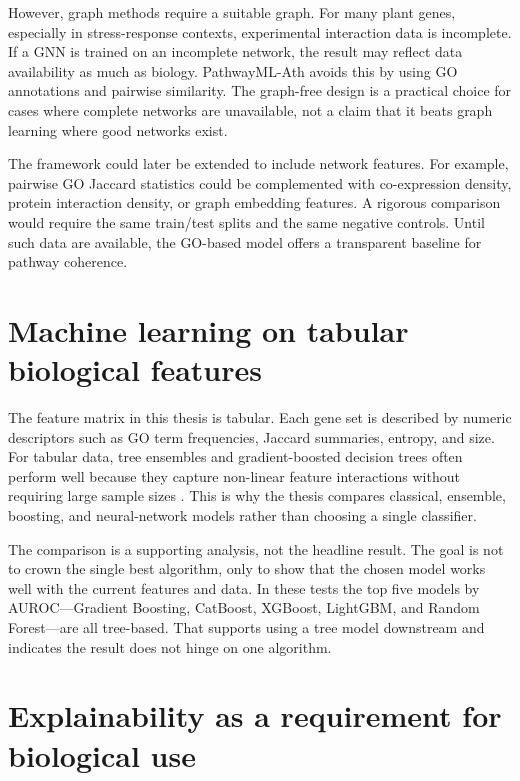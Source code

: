 \documentclass[12pt,letterpaper,oneside,openany]{book}
\begin{document}
However, graph methods require a suitable graph. For many plant genes, especially in stress-response contexts, experimental interaction data is incomplete. If a GNN is trained on an incomplete network, the result may reflect data availability as much as biology. PathwayML-Ath avoids this by using GO annotations and pairwise similarity. The graph-free design is a practical choice for cases where complete networks are unavailable, not a claim that it beats graph learning where good networks exist.

The framework could later be extended to include network features. For example, pairwise GO Jaccard statistics could be complemented with co-expression density, protein interaction density, or graph embedding features. A rigorous comparison would require the same train/test splits and the same negative controls. Until such data are available, the GO-based model offers a transparent baseline for pathway coherence.

\section{Machine learning on tabular biological features}
\label{sec:lit_tabular_extended}

The feature matrix in this thesis is tabular. Each gene set is described by numeric descriptors such as GO term frequencies, Jaccard summaries, entropy, and size. For tabular data, tree ensembles and gradient-boosted decision trees often perform well because they capture non-linear feature interactions without requiring large sample sizes \citep{breiman2001random,friedman2001greedy,chen2016xgboost,ke2017lightgbm,prokhorenkova2018catboost,grinsztajn2022why}. This is why the thesis compares classical, ensemble, boosting, and neural-network models rather than choosing a single classifier.

The comparison is a supporting analysis, not the headline result. The goal is not to crown the single best algorithm, only to show that the chosen model works well with the current features and data. In these tests the top five models by AUROC---Gradient Boosting, CatBoost, XGBoost, LightGBM, and Random Forest---are all tree-based. That supports using a tree model downstream and indicates the result does not hinge on one algorithm.

\section{Explainability as a requirement for biological use}
\label{sec:lit_xai_extended}
\end{document}
